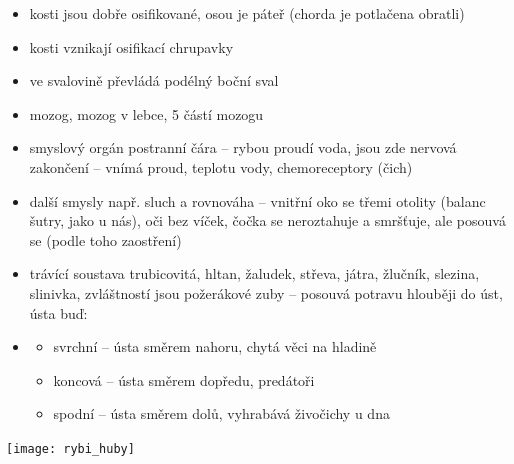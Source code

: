 \documentclass{article}
\begin{document}
\begin{itemize}
  \item kosti jsou dobře osifikované, osou je páteř (chorda je potlačena obratli)
  \item kosti vznikají osifikací chrupavky
  \item ve svalovině převládá podélný boční sval
  \item mozog, mozog v lebce, 5 částí mozogu
  \item smyslový orgán postranní čára -- rybou proudí voda, jsou zde nervová zakončení -- vnímá proud, teplotu vody, chemoreceptory (čich)
  \item další smysly např. sluch a rovnováha -- vnitřní oko se třemi otolity (balanc šutry, jako u nás), oči bez víček, čočka se neroztahuje a smršťuje, ale posouvá se (podle toho zaostření)
\end{itemize}
\begin{minipage}{\textwidth}
  \begin{itemize}
    \item trávící soustava trubicovitá, hltan, žaludek, střeva, játra, žlučník, slezina, slinivka, zvláštností jsou požerákové zuby -- posouvá potravu hlouběji do úst, ústa buď:
  \end{itemize}
\end{minipage}
\begin{minipage}{0.62\textwidth}\raggedleft
  \begin{itemize}
    \item[]
    \begin{itemize}
      \item svrchní -- ústa směrem nahoru, chytá věci na hladině
      \item koncová -- ústa směrem dopředu, predátoři
      \item spodní -- ústa směrem dolů, vyhrabává živočichy u dna
    \end{itemize}
  \end{itemize}
\end{minipage}
\hfill
\noindent\begin{minipage}{0.38\textwidth}
    \texttt{[image: rybi\_huby]}
\end{minipage}
\end{document}
